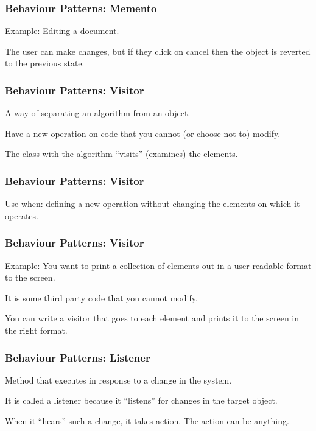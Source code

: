 \begin{frame}
\frametitle{Behaviour Patterns: Memento}
\begin{changemargin}{1cm}

Example: Editing a document. 

The user can make changes, but if they click on cancel then the object is reverted to the previous state. 

\end{changemargin}
\end{frame}

\begin{frame}
\frametitle{Behaviour Patterns: Visitor}
\begin{changemargin}{1cm}

A way of separating an algorithm from an object. 

Have a new operation on code that you cannot (or choose not to) modify. 

The class with the algorithm ``visits'' (examines) the elements.

\end{changemargin}
\end{frame}

\begin{frame}
\frametitle{Behaviour Patterns: Visitor}
\begin{changemargin}{1cm}

Use when: defining a new operation without changing the elements on which it operates.

\end{changemargin}
\end{frame}

\begin{frame}
\frametitle{Behaviour Patterns: Visitor}
\begin{changemargin}{1cm}

Example: You want to print a collection of elements out in a user-readable format to the screen. 

It is some third party code that you cannot modify.

You can write a visitor that goes to each element and prints it to the screen in the right format. 

\end{changemargin}
\end{frame}

\begin{frame}
\frametitle{Behaviour Patterns: Listener}
\begin{changemargin}{1cm}

Method that executes in response to a change in the system. 

It is called a listener because it ``listens'' for changes in the target object. 

When it ``hears'' such a change, it takes action. The action can be anything.

\end{changemargin}
\end{frame}

